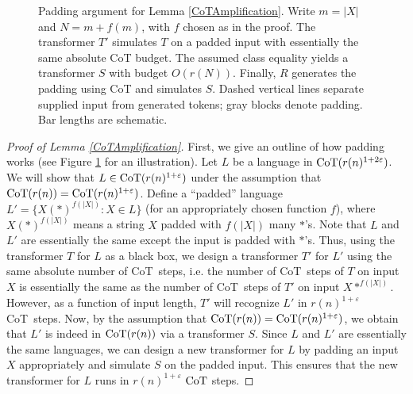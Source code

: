 \documentclass{article}
\let\epsilon\varepsilon
\theoremstyle{definition}
\newcommand{\0}{\mathbf{0}}
\newcommand{\CoT}{\mbox{\rm CoT}}
\newcommand{\1}{\mathbbm{1}}
\begin{document}
\begin{figure}[tbp]
  \centering
  \resizebox{\linewidth}{!}{}
  \caption{Padding argument for Lemma \ref{CoTAmplification}.
  Write $m=|X|$ and $N=m+f(m)$, with $f$ chosen as in the proof.
  The transformer $T'$ simulates $T$ on a padded input with
  essentially the same absolute CoT budget.
  The assumed class equality yields a transformer $S$ with
  budget $O(r(N))$. Finally, $R$ generates the padding using
  CoT and simulates $S$.
  Dashed vertical lines separate supplied input from generated
  tokens; gray blocks denote padding. Bar lengths are schematic.}
  \label{fig:padding-outline}
\end{figure}

\begin{proof}[Proof of Lemma \ref{CoTAmplification}] First, we give an outline of how padding works (see Figure \ref{fig:padding-outline} for an illustration). Let $L$ be a language in $\CoT(r(n)^{1 + 2 \epsilon})$. We will show that $L \in \CoT(r(n)^{1 + \epsilon})$ under the assumption that $\CoT(r(n)) = \CoT(r(n)^{1 + \epsilon})$. Define a ``padded'' language $L' = \{X (*)^{f(|X|)} : X \in L\}$ (for an appropriately chosen function $f$), where $X (*)^{f(|X|)}$ means a string $X$ padded with $f(|X|)$ many $*$'s. Note that $L$ and $L'$ are essentially the same except the input is padded with $*$'s. Thus, using the transformer $T$ for $L$ as a black box, we design a transformer $T'$ for $L'$ using the same absolute number of \CoT\ steps, i.e. the number of \CoT\ steps of $T$ on input $X$ is essentially the same as the number of \CoT\ steps of $T'$ on input $X*^{f(|X|)}$.  However, as a function of input length, $T'$ will recognize $L'$ in $r(n)^{1 + \epsilon}$ \CoT\ steps. Now, by the assumption that  $\CoT(r(n)) = \CoT(r(n)^{1 + \epsilon})$, we obtain that $L'$ is indeed in $\CoT(r(n))$ via a transformer $S$. Since $L$ and $L'$ are essentially the same languages, we can design a new transformer for $L$ by padding an input $X$ appropriately and simulate $S$ on the padded input. This ensures that the new transformer for $L$ runs in $r(n)^{1+\epsilon}$ $\CoT$ steps. 





\end{proof}
\end{document}
